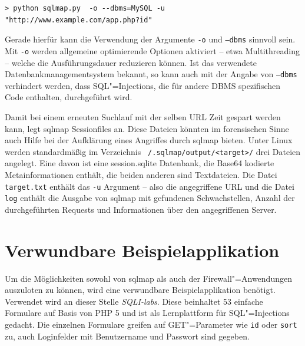 \begin{listing}[ht!]
\begin{verbatim}
> python sqlmap.py  -o --dbms=MySQL -u "http://www.example.com/app.php?id"
\end{verbatim}
\end{listing}

Gerade hierfür kann die Verwendung der Argumente \texttt{-o} und \texttt{--dbms} sinnvoll sein. Mit \texttt{-o} werden allgemeine optimierende Optionen aktiviert -- etwa Multithreading -- welche die Ausführungsdauer reduzieren können. Ist das verwendete Datenbankmanagementsystem bekannt, so kann auch mit der Angabe von \texttt{--dbms} verhindert werden, dass SQL"=Injections, die für andere DBMS spezifischen Code enthalten, durchgeführt wird.


Damit bei einem erneuten Suchlauf mit der selben URL Zeit gespart werden kann, legt sqlmap Sessionfiles an. Diese Dateien könnten im forensischen Sinne auch Hilfe bei der Aufklärung eines Angriffes durch sqlmap bieten. Unter Linux werden standardmäßig im Verzeichnis \texttt{~/.sqlmap/output/<target>/} drei Dateien angelegt. Eine davon ist eine session.sqlite Datenbank, die Base64 kodierte Metainformationen enthält, die beiden anderen sind Textdateien. Die Datei \texttt{target.txt} enthält das \texttt{-u} Argument -- also die angegriffene URL und die Datei \texttt{log} enthält die Ausgabe von sqlmap mit gefundenen Schwachstellen, Anzahl der durchgeführten Requests und Informationen über den angegriffenen Server.

\section{Verwundbare Beispielapplikation}

Um die Möglichkeiten sowohl von sqlmap als auch der Firewall"=Anwendungen auszuloten zu können, wird eine verwundbare Beispielapplikation benötigt. Verwendet wird an dieser Stelle \emph{SQLI-labs}. Diese beinhaltet 53 einfache Formulare auf Basis von PHP 5 und ist als Lernplattform für SQL"=Injections gedacht. Die einzelnen Formulare greifen auf GET"=Parameter wie \texttt{id} oder \texttt{sort} zu, auch Loginfelder mit Benutzername und Passwort sind gegeben.

